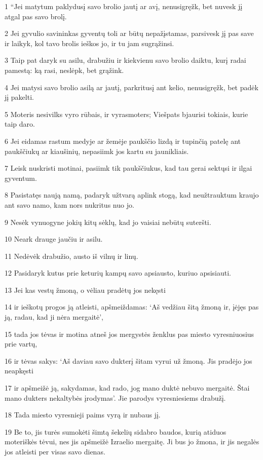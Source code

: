 \par 1 “Jei matytum paklydusį savo brolio jautį ar avį, nenusigręžk, bet nuvesk jį atgal pas savo brolį. 
\par 2 Jei gyvulio savininkas gyventų toli ar būtų nepažįstamas, parsivesk jį pas save ir laikyk, kol tavo brolis ieškos jo, ir tu jam sugrąžinsi. 
\par 3 Taip pat daryk su asilu, drabužiu ir kiekvienu savo brolio daiktu, kurį radai pamestą: ką rasi, neslėpk, bet grąžink. 
\par 4 Jei matysi savo brolio asilą ar jautį, parkritusį ant kelio, nenusigręžk, bet padėk jį pakelti. 
\par 5 Moteris nesivilks vyro rūbais, ir vyras­moters; Viešpats bjaurisi tokiais, kurie taip daro. 
\par 6 Jei eidamas rastum medyje ar žemėje paukščio lizdą ir tupinčią patelę ant paukščiukų ar kiaušinių, nepasiimk jos kartu su jaunikliais. 
\par 7 Leisk nuskristi motinai, pasiimk tik paukščiukus, kad tau gerai sektųsi ir ilgai gyventum. 
\par 8 Pasistatęs naują namą, padaryk užtvarą aplink stogą, kad neužtrauktum kraujo ant savo namo, kam nors nukritus nuo jo. 
\par 9 Nesėk vynuogyne jokių kitų sėklų, kad jo vaisiai nebūtų suteršti. 
\par 10 Neark drauge jaučiu ir asilu. 
\par 11 Nedėvėk drabužio, austo iš vilnų ir linų. 
\par 12 Pasidaryk kutus prie keturių kampų savo apsiausto, kuriuo apsisiauti. 
\par 13 Jei kas vestų žmoną, o vėliau pradėtų jos nekęsti 
\par 14 ir ieškotų progos ją atleisti, apšmeiždamas: ‘Aš vedžiau šitą žmoną ir, įėjęs pas ją, radau, kad ji nėra mergaitė’, 
\par 15 tada jos tėvas ir motina atneš jos mergystės ženklus pas miesto vyresniuosius prie vartų, 
\par 16 ir tėvas sakys: ‘Aš daviau savo dukterį šitam vyrui už žmoną. Jis pradėjo jos neapkęsti 
\par 17 ir apšmeižė ją, sakydamas, kad rado, jog mano duktė nebuvo mergaitė. Štai mano dukters nekaltybės įrodymas’. Jie parodys vyresniesiems drabužį. 
\par 18 Tada miesto vyresnieji paims vyrą ir nubaus jį. 
\par 19 Be to, jis turės sumokėti šimtą šekelių sidabro baudos, kurią atiduos moteriškės tėvui, nes jis apšmeižė Izraelio mergaitę. Ji bus jo žmona, ir jis negalės jos atleisti per visas savo dienas. 

